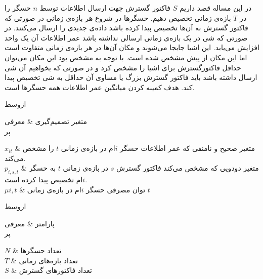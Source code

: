 

در این مساله قصد داریم $S$ فاکتور گسترش جهت ارسال اطلاعات توسط $n$ حسگر را در $T$ بازه‌ی زمانی تخصیص دهیم.
حسگرها در شروع هر بازه‌ی زمانی در صورتی که فاکتور گسترش به آن‌ها تخصیص پیدا کرده باشد داده‌ی جدیدی را ارسال می‌کنند.
در صورتی که شی در یک بازه‌ی زمانی ارسالی نداشته باشد عمر اطلاعات آن یک واحد افزایش می‌یابد.
این اشیا جابجا می‌شوند و مکان آن‌ها در هر بازه‌ی زمانی متفاوت است اما این مکان از پیش مشخص شده است.
با توجه به مشخص بود این مکان می‌توان حداقل فاکتورگسترش برای اشیا را مشخص کرد و در صورتی که بخواهیم آن شی ارسال داشته باشد
باید فاکتور گسترش بزرگ یا مساوی آن حداقل به شی تخصیص پیدا کند.
هدف کمینه کردن میانگین عمر اطلاعات همه حسگر‌ها است.


‌ازوسط



متغیر تصمیم‌گیری & معرفی \\

‌پر

$x_{it}$ & متغیر صحیح و نامنفی که عمر اطلاعات حسگر $i$ام در بازه‌ی زمانی $t$ را مشخص می‌کند. \\

$p_{i,s,t}$ & متغیر دودویی که مشخص می‌کند فاکتور گسترش $s$ در بازه‌ی زمانی $t$ به حسگر $i$ام تخصیص پیدا کرده است. \\

$\mu{i,t}$ & توان مصرفی حسگر $i$ام در بازه‌ی زمانی $t$ \\





‌ازوسط



پارامتر & معرفی \\

‌پر

$N$ & تعداد حسگرها \\

$T$ & تعداد بازه‌های زمانی \\

$S$ & تعداد فاکتورهای گسترش \\

